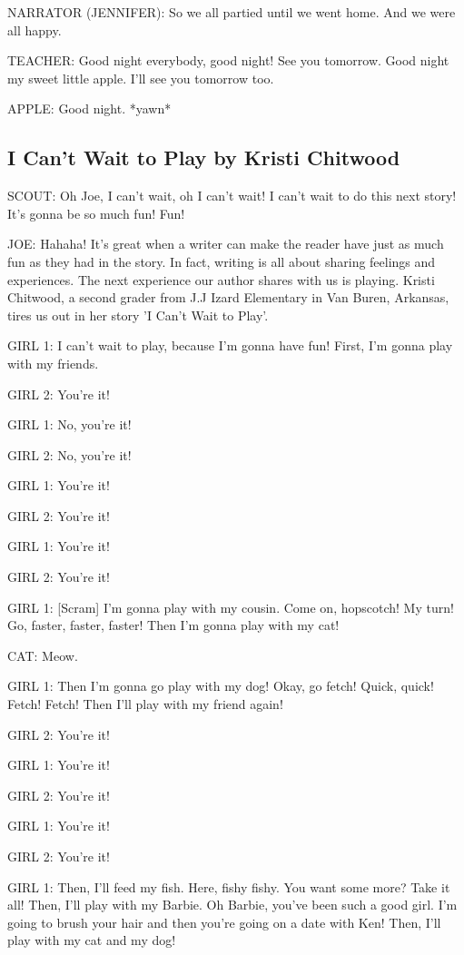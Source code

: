 NARRATOR (JENNIFER):
So we all partied until we went home.
And we were all happy.

TEACHER:
Good night everybody, good night!
See you tomorrow.
Good night my sweet little apple.
I'll see you tomorrow too.

APPLE:
Good night.
*yawn*

\subsection{I Can't Wait to Play by Kristi Chitwood}

SCOUT:
Oh Joe, I can't wait, oh I can't wait!
I can't wait to do this next story!
It's gonna be so much fun!
Fun!

JOE:
Hahaha!
It's great when a writer can make the reader have just as much fun as they had in the story.
In fact, writing is all about sharing feelings and experiences.
The next experience our author shares with us is playing.
Kristi Chitwood, a second grader from J.J Izard Elementary in Van Buren, Arkansas, tires us out in her story 'I Can't Wait to Play'.

GIRL 1:
I can't wait to play, because I'm gonna have fun!
First, I'm gonna play with my friends.

GIRL 2:
You're it!

GIRL 1:
No, you're it!

GIRL 2:
No, you're it!

GIRL 1:
You're it!

GIRL 2:
You're it!

GIRL 1:
You're it!

GIRL 2:
You're it!

GIRL 1:
[Scram]
I'm gonna play with my cousin.
Come on, hopscotch!
My turn!
Go, faster, faster, faster!
Then I'm gonna play with my cat!

CAT:
Meow.

GIRL 1:
Then I'm gonna go play with my dog!
Okay, go fetch!
Quick, quick!
Fetch!
Fetch!
Then I'll play with my friend again!

GIRL 2:
You're it!

GIRL 1:
You're it!

GIRL 2:
You're it!

GIRL 1:
You're it!

GIRL 2:
You're it!

GIRL 1:
Then, I'll feed my fish.
Here, fishy fishy.
You want some more?
Take it all!
Then, I'll play with my Barbie.
Oh Barbie, you've been such a good girl.
I'm going to brush your hair and then you're going on a date with Ken!
Then, I'll play with my cat and my dog!

